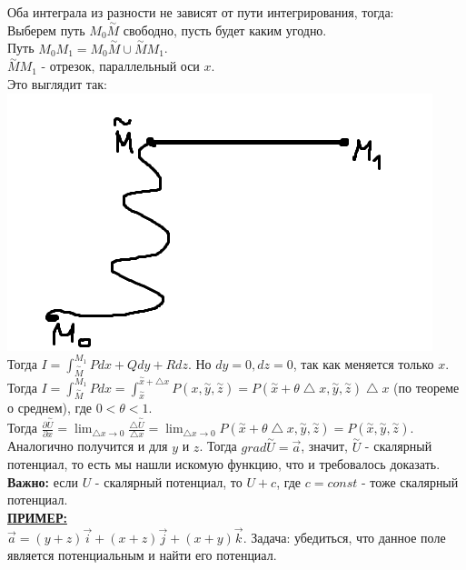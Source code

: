 \documentclass[12pt]{article}
\begin{document}
Оба интеграла из разности не зависят от пути интегрирования, тогда:\\
Выберем путь $M_0 \overset{\sim}{M}$ свободно, пусть будет каким угодно.\\
Путь $M_0 M_1 = M_0 \overset{\sim}{M} \cup \overset{\sim}{M} M_1$.\\
$\overset{\sim}{M} M_1$ - отрезок, параллельный оси $x$.\\
Это выглядит так:\\
\includegraphics{potentialFields1}\\
Тогда $I = \int_{\overset{\sim}{M}}^{M_1} Pdx + Qdy + Rdz$. Но $dy = 0, dz = 0$, так как меняется только $x$. Тогда $I = \int_{\overset{\sim}{M}}^{M_1} Pdx = \int_{\overset{\sim}{x}}^{\overset{\sim}{x}+{\bigtriangleup x}} P(x, \overset{\sim}{y}, \overset{\sim}{z}) = P(\overset{\sim}{x}+\theta \bigtriangleup x, \overset{\sim}{y}, \overset{\sim}{z}) \bigtriangleup x$ (по теореме о среднем), где $0 < \theta < 1$.\\
Тогда $\frac{\partial \overset{\sim}{U}}{\partial x} = \lim_{\bigtriangleup x \to 0} \frac{\bigtriangleup \overset{\sim}{U}}{\bigtriangleup x} = \lim_{\bigtriangleup x \to 0} P(\overset{\sim}{x}+\theta \bigtriangleup x, \overset{\sim}{y}, \overset{\sim}{z}) = P(\overset{\sim}{x}, \overset{\sim}{y}, \overset{\sim}{z})$.\\
Аналогично получится и для $y$ и $z$. Тогда $grad \overset{\sim}{U} = \overrightarrow{a}$, значит, $\overset{\sim}{U}$ - скалярный потенциал, то есть мы нашли искомую функцию, что и требовалось доказать.\\
\textbf{Важно:} если $U$ - скалярный потенциал, то $U + c$, где $c = const$ - тоже скалярный потенциал.\\
\uline{\textbf{ПРИМЕР:}}\\
$\overrightarrow{a} = (y+z) \overrightarrow{i} + (x+z) \overrightarrow{j} + (x+y)\overrightarrow{k}$. Задача: убедиться, что данное поле является потенциальным и найти его потенциал.\\
\end{document}
